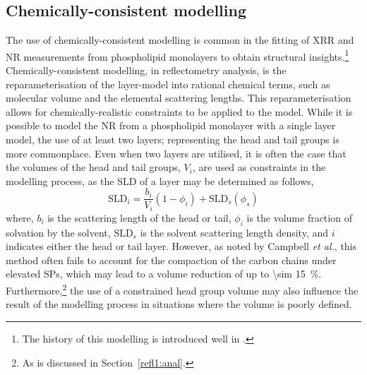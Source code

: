 \subsection{Chemically-consistent modelling}
The use of chemically-consistent modelling is common in the fitting of XRR and NR measurements from phospholipid monolayers to obtain structural insights.\footnote{The history of this modelling is introduced well in \cite{campbell_structure_2018}.}
Chemically-consistent modelling, in reflectometry analysis, is the reparameterisation of the layer-model into rational chemical terms, such as molecular volume and the elemental scattering lengths. 
This reparameterisation allows for chemically-realistic constraints to be applied to the model.  
While it is possible to model the NR from a phospholipid monolayer with a single layer model,\autocite{wojciechowski_interaction_2016,wojciechowski_complexation_2016} the use of at least two layers; representing the head and tail groups is more commonplace.\autocite{foglia_interaction_2014,bello_influence_2016}
Even when two layers are utilised, it is often the case that the volumes of the head and tail groups, $V_i$, are used as constraints in the modelling process, as the SLD of a layer may be determined as follows,
%
\begin{equation}
\text{SLD}_i = \frac{b_i}{V_i}(1-\phi_i)+\text{SLD}_s(\phi_s)
\label{equ:sld}
\end{equation}
%
where, $b_i$ is the scattering length of the head or tail, $\phi_i$ is the volume fraction of solvation by the solvent, $\text{SLD}_s$ is the solvent scattering length density, and $i$ indicates either the head or tail layer.
However, as noted by Campbell \emph{et al.},\autocite{campbell_structure_2018} this method often fails to account for the compaction of the carbon chains under elevated SPs,\autocite{mcconlogue_close_1997,small_lateral_1984} which may lead to a volume reduction of up to \SI{\sim 15}{\percent}.
Furthermore,\footnote{As is discussed in Section~\ref{refl1:anal}.} the use of a constrained head group volume may also influence the result of the modelling process in situations where the volume is poorly defined.

